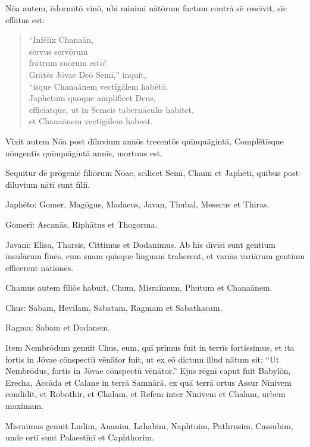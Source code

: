 \Versus Nōa autem, ēdormītō vīnō, ubi minimī nātōrum factum contrā sē rescīvit, sīc effātus est:


\begin{verse}
\begin{patverse*}
\Versus ``Īnfēlīx Chanaān,\\
servus servōrum\\
frātrum suōrum estō!\\
\Versus Grātēs Jōvae Deō Semī,'' inquit,\\
``isque Chanaānem vectīgālem habētō.\\
\Versus Japhētum quoque amplificet Deus,\\
efficiatque, ut in Semeis tabernāculīs habitet,\\
et Chanaānem vectīgālem habeat.
\end{patverse*}
\end{verse}

\Versus Vīxit autem Nōa post dīluvium annōs trecentōs quīnquāgintā,
\Versus Complētīsque nōngentīs quīnquāgintā annīs, mortuus est.



\Caput
\Versus Sequitur dē prōgeniē fīliōrum Nōae, scīlicet Semī, Chamī et Japhētī, quibus post dīluvium nātī sunt fīliī.

\Versus Japhēto: Gomer, Magōgus, Madaeus, Javan, Thubal, Mesecus et Thiras.

\Versus Gomerī: Ascanās, Riphātus et Thogorma.

\Versus Javanī: Elisa, Tharsis, Cittimus et Dodanimus.
\Versus Ab hīs dīvīsī sunt gentium īnsulārum fīnēs, cum suam quisque linguam traherent, et variās variārum gentium efficerent nātiōnēs.

\Versus Chamus autem fīliōs habuit, Chum, Misraīmum, Phutum et Chanaānem.

\Versus Chus: Sabam, Hevilam, Sabatam, Ragmam et Sabathacam.

Ragma: Sabam et Dodanem.

\Versus Item Nembrōdum genuit Chus, eum, quī prīmus fuit in terrīs fortissimus,
\Versus et ita fortis in Jōvae cōnspectū vēnātor fuit, ut ex eō dictum illud nātum sit: ``Ut Nembrōdus, fortis in Jōvae cōnspectū vēnātor.''
\Versus Ejus rēgnī caput fuit Babylōn, Erecha, Accāda et Calane in terrā Samnārā,
\Versus ex quā terrā ortus Assur Nīnivem condidit, et Robothir, et Chalam,
\Versus et Refem inter Nīnivem et Chalam, urbem maximam.

\Versus Misraīmus genuit Ludim, Ananim, Lahabim,
\Versus Naphtuim, Pathrusim, Cassubim, unde ortī sunt Palaestīnī et Caphthorim.

